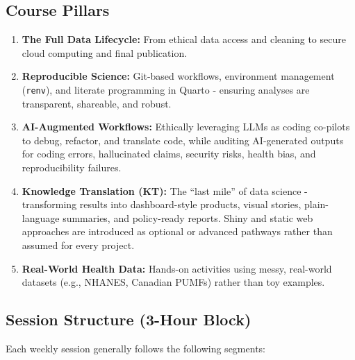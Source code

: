 \documentclass[
  letterpaper,
  DIV=11,
  numbers=noendperiod,
  oneside]{scrreprt}
\providecommand{\tightlist}{%
  \setlength{\itemsep}{0pt}\setlength{\parskip}{0pt}}
\begin{document}
\subsection{Course Pillars}\label{course-pillars}

\begin{enumerate}
\def\labelenumi{\arabic{enumi}.}
\tightlist
\item
  \textbf{The Full Data Lifecycle:} From ethical data access and
  cleaning to secure cloud computing and final publication.
\item
  \textbf{Reproducible Science:} Git-based workflows, environment
  management (\texttt{renv}), and literate programming in Quarto -
  ensuring analyses are transparent, shareable, and robust.
\item
  \textbf{AI-Augmented Workflows:} Ethically leveraging LLMs as coding
  co-pilots to debug, refactor, and translate code, while auditing
  AI-generated outputs for coding errors, hallucinated claims, security
  risks, health bias, and reproducibility failures.
\item
  \textbf{Knowledge Translation (KT):} The ``last mile'' of data science
  - transforming results into dashboard-style products, visual stories,
  plain-language summaries, and policy-ready reports. Shiny and static
  web approaches are introduced as optional or advanced pathways rather
  than assumed for every project.
\item
  \textbf{Real-World Health Data:} Hands-on activities using messy,
  real-world datasets (e.g., NHANES, Canadian PUMFs) rather than toy
  examples.
\end{enumerate}

\subsection{Session Structure (3-Hour
Block)}\label{session-structure-3-hour-block}

Each weekly session generally follows the following segments:
\end{document}
